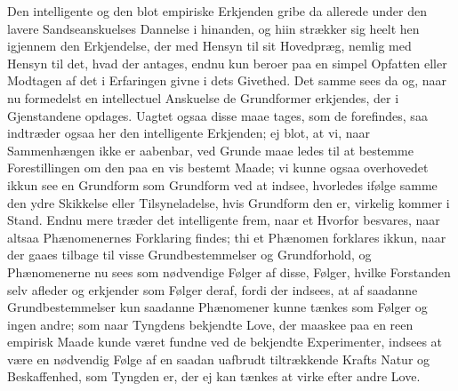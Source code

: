 \documentclass[12pt,a4paper]{book}
\newcommand{\apage}[1]{\marginnote{\footnotesize\textit{[#1]}}}
\begin{document}
Den intelligente og den blot empiriske Erkjenden gribe da allerede under den
lavere  \apage{61} Sandseanskuelses Dannelse i hinanden, og hiin strækker sig heelt hen
igjennem den Erkjendelse, der med Hensyn til sit Hovedpræg, nemlig med Hensyn til
det, hvad der antages, endnu kun beroer paa en simpel Opfatten eller Modtagen af
det i Erfaringen givne i dets Givethed. Det samme sees da og, naar nu formedelst
en intellectuel Anskuelse de Grundformer erkjendes, der i Gjenstandene opdages.
Uagtet ogsaa disse maae tages, som de forefindes, saa indtræder ogsaa her den
intelligente Erkjenden; ej blot, at vi, naar Sammenhængen ikke er aabenbar, ved
Grunde maae ledes til at bestemme Forestillingen om den paa en vis bestemt Maade;
vi kunne ogsaa overhovedet ikkun see en Grundform som Grundform ved at indsee,
hvorledes ifølge samme den ydre Skikkelse eller Tilsyneladelse, hvis Grundform den
er, virkelig kommer i Stand. Endnu mere træder det intelligente frem, naar et
Hvorfor besvares, naar altsaa Phænomenernes Forklaring findes; thi et Phænomen
forklares ikkun, naar der gaaes tilbage til visse Grundbestemmelser og
Grundforhold, og Phænomenerne nu sees som nødvendige Følger af disse, Følger,
hvilke Forstanden selv afleder og erkjender som Følger deraf, fordi der indsees,
at af saadanne Grundbestemmelser kun saadanne Phænomener kunne tænkes som Følger
og ingen andre; som naar Tyngdens bekjendte Love, der maaskee paa en reen
empirisk Maade \apage{62}  kunde været fundne ved de bekjendte Experimenter, indsees at være
en nødvendig Følge af en saadan uafbrudt tiltrækkende Krafts Natur og
Beskaffenhed, som Tyngden er, der ej kan tænkes at virke efter andre Love.
\end{document}
